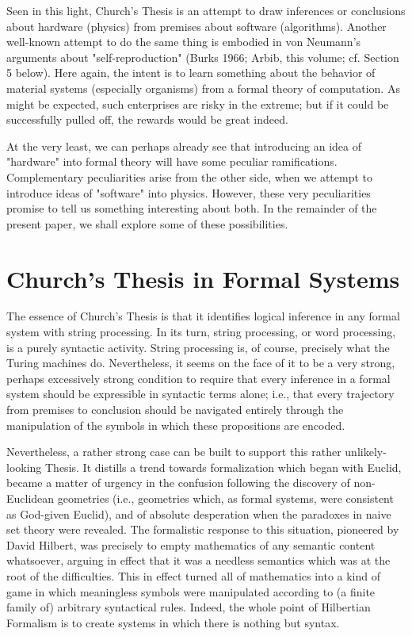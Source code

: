 \documentclass[a4paper,12pt]{article}
\begin{document}
Seen in this light, Church's Thesis is an attempt to draw inferences or conclusions about hardware (physics) from premises about software
(algorithms). Another well-known attempt to do the same thing is embodied in von Neumann's arguments about "self-reproduction"
(Burks 1966; Arbib, this volume; cf. Section 5 below). Here again, the intent is to learn something about the behavior of material systems
(especially organisms) from a formal theory of computation. As might be expected, such enterprises are risky in the extreme;
but if it could be successfully pulled off, the rewards would be great indeed.

At the very least, we can perhaps already see that introducing an idea of "hardware" into formal theory will have some peculiar
ramifications. Complementary peculiarities arise from the other side, when we attempt to introduce ideas of "software" into physics.
However, these very peculiarities promise to tell us something interesting about both. In the remainder of the present paper, we shall
explore some of these possibilities.

\section{Church's Thesis in Formal Systems}

The essence of Church's Thesis is that it identifies logical inference in any
formal system with string processing. In its turn, string processing, or word
processing, is a purely syntactic activity.  String processing is, of course,
precisely what the Turing machines do. Nevertheless, it seems on the face
of it to be a very strong, perhaps excessively strong condition to require
that every inference in a formal system should be expressible in syntactic
terms alone; i.e., that every trajectory from premises to conclusion should be
navigated entirely through the manipulation of the symbols in which these
propositions are encoded.

Nevertheless, a rather strong case can be built to support this rather
unlikely-looking Thesis. It distills a trend towards formalization which
began with Euclid, became a matter of urgency in the confusion following the
discovery of non-Euclidean geometries (i.e., geometries which, as formal
systems, were consistent as God-given Euclid), and of absolute desperation
when the paradoxes in naive set theory were revealed. The formalistic response
to this situation, pioneered by David Hilbert, was precisely to empty
mathematics of any semantic content whatsoever, arguing in effect that it
was a needless semantics which was at the root of the difficulties.
This in effect turned all of mathematics into a kind of game in which meaningless
symbols were manipulated according to (a finite family of) arbitrary syntactical rules.
Indeed, the whole point of Hilbertian Formalism is to create systems in which there is
nothing but syntax.
\end{document}
